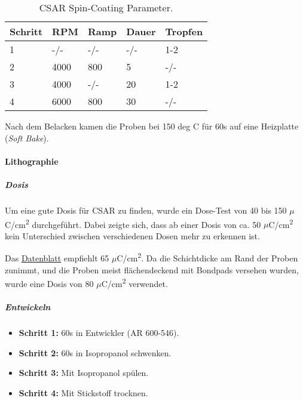 \documentclass[
  paper=a4,
  ,captions=tableheading
]{scrartcl}
\providecommand{\tightlist}{%
  \setlength{\itemsep}{0pt}\setlength{\parskip}{0pt}}
\begin{document}
\begin{table}

\caption{\label{tab:prep-spin}CSAR Spin-Coating Parameter.}
\centering
\begin{tabular}[t]{l|l|l|l|l}
\hline
Schritt & RPM & Ramp & Dauer & Tropfen\\
\hline
1 & -/- & -/- & -/- & 1-2\\
\hline
2 & 4000 & 800 & 5 & -/-\\
\hline
3 & 4000 & -/- & 20 & 1-2\\
\hline
4 & 6000 & 800 & 30 & -/-\\
\hline
\end{tabular}
\end{table}

Nach dem Belacken kamen die Proben bei 150 deg C für 60s auf eine Heizplatte (\emph{Soft Bake}).

\hypertarget{lithographie}{%
\paragraph{Lithographie}\label{lithographie}}

\hypertarget{dosis}{%
\subparagraph{Dosis}\label{dosis}}

Um eine gute Dosis für CSAR zu finden, wurde ein Dose-Test von 40 bis 150 \(\mu\)C/cm\textsuperscript{2} durchgeführt. Dabei zeigte sich, dass ab einer Dosis von ca. 50 \(\mu\)C/cm\textsuperscript{2} kein Unterschied zwischen verschiedenen Dosen mehr zu erkennen ist.

Das \href{https://www.allresist.de/wp-content/uploads/2020/03/AR-P6200_CSAR62_Deutsch_Allresist_Produktinformation.pdf}{Datenblatt} empfiehlt 65 \(\mu\)C/cm\textsuperscript{2}. Da die Schichtdicke am Rand der Proben zunimmt, und die Proben meist flächendeckend mit Bondpads versehen wurden, wurde eine Dosis von 80 \(\mu\)C/cm\textsuperscript{2} verwendet.

\hypertarget{entwickeln}{%
\subparagraph{Entwickeln}\label{entwickeln}}

\begin{itemize}
\tightlist
\item
  \textbf{Schritt 1:} 60s in Entwickler (AR 600-546).
\item
  \textbf{Schritt 2:} 60s in Isopropanol schwenken.
\item
  \textbf{Schritt 3:} Mit Isopropanol spülen.
\item
  \textbf{Schritt 4:} Mit Stickstoff trocknen.
\end{itemize}
\end{document}
